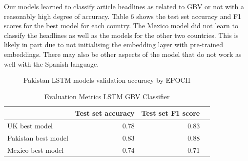 \documentclass{article}
\begin{document}
{{Our models learned to classify article headlines as related to GBV or not with a reasonably high degree of accuracy. Table 6 shows the test set accuracy and F1 scores for the best model for each country. The Mexico model did not learn to classify the headlines as well as the models for the other two countries. This is likely in part due to not initialising the embedding layer with pre-trained embeddings. There may also be other aspects of the model that do not work as well with the Spanish language.


\begin{figure}[H]
	\caption{\label{fig:my-label1} Pakistan LSTM models validation accuracy by EPOCH}
\end{figure}

}
\begin{table}[!htp]\centering
	\caption{Evaluation Metrics LSTM GBV Classifier}\label{tab: }
	\scriptsize
	\begin{tabular}{lrrr}\toprule
		&Test set accuracy &Test set F1 score \\\midrule
		UK best model &0.78 &0.83 \\
		Pakistan best model &0.83 &0.88 \\
		Mexico best model &0.74 &0.71 \\
		\bottomrule
	\end{tabular}
\end{table}
	
}
\newpage
\end{document}
